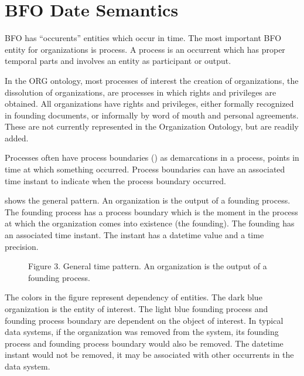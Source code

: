 \documentclass[letterpaper,10pt,english]{sphinxmanual}
\begin{document}
\section{BFO Date Semantics}
\label{\detokenize{datetimes:bfo-date-semantics}}
\sphinxAtStartPar
BFO has “occurents” \textendash{} entities which occur in time.  The most important BFO entity
for organizations is  \textendash{} process.  A process is an occurrent which
has proper temporal parts and involves an entity as participant or output.

\sphinxAtStartPar
In the ORG ontology, most processes of interest \textendash{} the creation of organizations,
the dissolution of organizations, are
processes in which rights and privileges are obtained.  All
organizations have rights and privileges, either formally recognized in founding
documents, or informally by word of mouth and personal agreements.  These are not
currently represented in the Organization Ontology, but are readily added.

\sphinxAtStartPar
Processes often have process boundaries () as demarcations in a process, points
in time at which something occurred.  Process boundaries can have an
associated time instant to indicate when the process boundary occurred.

\sphinxAtStartPar
{\hyperref[\detokenize{datetimes:figure-3}]{}} shows the general pattern.  An organization is the output of a founding
process.  The founding process has a process boundary which is
the moment in the process at which the organization comes into existence (the founding).
The founding has an associated time instant.  The instant has a datetime value and
a time precision.

\begin{figure}[htbp]
\centering
\capstart

\noindent{}
\caption{Figure 3.  General time pattern.  An organization is the output of a founding process.}\label{\detokenize{datetimes:id3}}\label{\detokenize{datetimes:figure-3}}\end{figure}

\sphinxAtStartPar
{}  The colors in the figure represent dependency of entities.  The
dark blue organization is the
entity of interest.  The light blue founding process and founding process boundary are
dependent on
the object of interest.  In typical data systems, if the organization was removed from
the system,
its founding process and founding process boundary would also be removed.  The datetime
instant would not be removed, it may be associated with other occurrents in the data
system.
\end{document}
